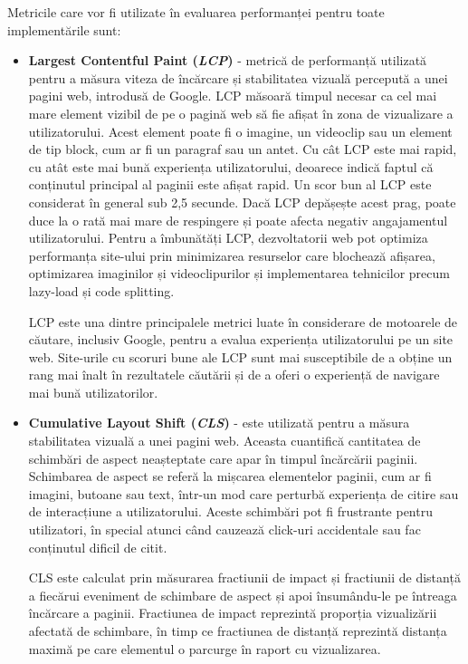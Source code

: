 \documentclass[12pt, a4paper]{report}
\begin{document}
Metricile care vor fi utilizate în evaluarea performanței pentru toate implementările sunt:

\begin{itemize}
	\item \textbf{Largest Contentful Paint (\emph{LCP})} - metrică de performanță utilizată pentru a măsura viteza de încărcare și stabilitatea vizuală percepută a unei pagini web, introdusă de Google. LCP măsoară timpul necesar ca cel mai mare element vizibil de pe o pagină web să fie afișat în zona de vizualizare a utilizatorului. Acest element poate fi o imagine, un videoclip sau un element de tip block, cum ar fi un paragraf sau un antet. Cu cât LCP este mai rapid, cu atât este mai bună experiența utilizatorului, deoarece indică faptul că conținutul principal al paginii este afișat rapid. Un scor bun al LCP este considerat în general sub 2,5 secunde. Dacă LCP depășește acest prag, poate duce la o rată mai mare de respingere și poate afecta negativ angajamentul utilizatorului. Pentru a îmbunătăți LCP, dezvoltatorii web pot optimiza performanța site-ului prin minimizarea resurselor care blochează afișarea, optimizarea imaginilor și videoclipurilor și implementarea tehnicilor precum lazy-load și code splitting.

	      LCP este una dintre principalele metrici luate în considerare de motoarele de căutare, inclusiv Google, pentru a evalua experiența utilizatorului pe un site web. Site-urile cu scoruri bune ale LCP sunt mai susceptibile de a obține un rang mai înalt în rezultatele căutării și de a oferi o experiență de navigare mai bună utilizatorilor.
	\item \textbf{Cumulative Layout Shift (\emph{CLS})} - este utilizată pentru a măsura stabilitatea vizuală a unei pagini web. Aceasta cuantifică cantitatea de schimbări de aspect neașteptate care apar în timpul încărcării paginii. Schimbarea de aspect se referă la mișcarea elementelor paginii, cum ar fi imagini, butoane sau text, într-un mod care perturbă experiența de citire sau de interacțiune a utilizatorului. Aceste schimbări pot fi frustrante pentru utilizatori, în special atunci când cauzează click-uri accidentale sau fac conținutul dificil de citit.

	      CLS este calculat prin măsurarea fractiunii de impact și fractiunii de distanță a fiecărui eveniment de schimbare de aspect și apoi însumându-le pe întreaga încărcare a paginii. Fractiunea de impact reprezintă proporția vizualizării afectată de schimbare, în timp ce fractiunea de distanță reprezintă distanța maximă pe care elementul o parcurge în raport cu vizualizarea.


\end{itemize}
\end{document}
